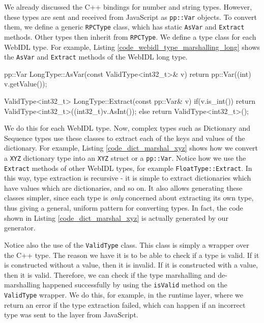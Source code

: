 We already discussed the C++ bindings for number and string types. However, these types are sent and received from JavaScript as \lstinline{pp::Var} objects. To convert them, we define a generic \lstinline{RPCType} class, which has static \lstinline{AsVar} and \lstinline{Extract} methods. Other types then inherit from \lstinline{RPCType}. We define a type class for each WebIDL type. For example, Listing \ref{code_webidl_type_marshalling_long} shows the \lstinline{AsVar} and \lstinline{Extract} methods of the WebIDL long type.

\begin{code}
pp::Var LongType::AsVar(const ValidType<int32_t>& v){
  return pp::Var((int) v.getValue());
}

ValidType<int32_t> LongType::Extract(const pp::Var& v){
  if(v.is_int()){
    return ValidType<int32_t>((int32_t)v.AsInt());
  } else {
    return ValidType<int32_t>();
  }
}
\end{code}

We do this for each WebIDL type. Now, complex types such as Dictionary and Sequence types use these classes to extract each of the keys and values of the dictionary. For example, Listing \ref{code_dict_marshal_xyz} shows how we convert a \lstinline{XYZ} dictionary type into an \lstinline{XYZ} struct or a \lstinline{pp::Var}. Notice how we use the \lstinline{Extract} methods of other WebIDL types, for example \lstinline{FloatType::Extract}. In this way, type extraction is recursive - it is simple to extract dictionaries which have values which are dictionaries, and so on. It also allows generating these classes simpler, since each type is \emph{only} concerned about extracting its own type, thus giving a general, uniform pattern for converting types. In fact, the code shown in Listing \ref{code_dict_marshal_xyz} is actually generated by our generator.

Notice also the use of the \lstinline{ValidType} class. This class is simply a wrapper over the C++ type. The reason we have it is to be able to check if a type is valid. If it is constructed without a value, then it is invalid. If it is constructed with a value, then it is valid. Therefore, we can check if the type marshalling and de-marshalling happened successfully by using the \lstinline{isValid} method on the \lstinline{ValidType} wrapper. We do this, for example, in the runtime layer, where we return an error if the type extraction failed, which can happen if an incorrect type was sent to the layer from JavaScript.


